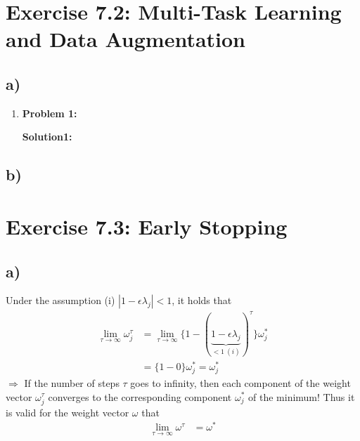 \documentclass[a4paper]{article}
\begin{document}
\newpage
\section*{Exercise 7.2: Multi-Task Learning and Data Augmentation}
    \subsection*{a)}
        \begin{enumerate}
            \item \textbf{Problem 1:}
                    
                \textbf{Solution1:}
        \end{enumerate}
    
    \subsection*{b)}



\newpage
\section*{Exercise 7.3: Early Stopping}
    \subsection*{a)}
        Under the assumption (i) $|1-\epsilon\lambda_j| < 1$, it holds that
        \begin{align}
            \lim_{\tau \rightarrow \infty} \omega^{\tau}_j &= \lim_{\tau \rightarrow \infty} \{1 - (\underbrace{1 - \epsilon\lambda_j}_{< 1\ (i)})^{\tau}\} \omega^{*}_j\\
            &= \{1 - 0\} \omega^{*}_j = \omega^{*}_j
        \end{align}
        $\Rightarrow$ If the number of steps $\tau$ goes to infinity, then each component of the weight vector $\omega^{\tau}_j$ converges to the corresponding component $\omega^*_j$ of the minimum! Thus it is valid for the weight vector $\omega$ that 
        \begin{align}
            \lim_{\tau \rightarrow \infty} \omega^{\tau} &= \omega^*
        \end{align}
    
\end{document}
